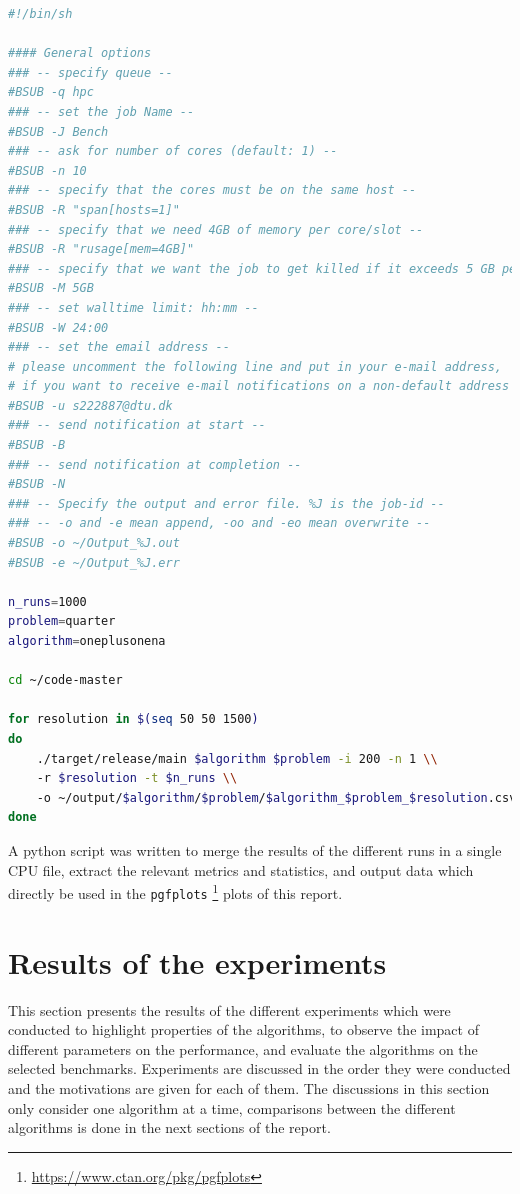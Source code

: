 \begin{lstlisting}[language=bash, caption=Example of a job script, label=lst:job_script]
#!/bin/sh

#### General options
### -- specify queue --
#BSUB -q hpc
### -- set the job Name --
#BSUB -J Bench
### -- ask for number of cores (default: 1) --
#BSUB -n 10
### -- specify that the cores must be on the same host --
#BSUB -R "span[hosts=1]"
### -- specify that we need 4GB of memory per core/slot --
#BSUB -R "rusage[mem=4GB]"
### -- specify that we want the job to get killed if it exceeds 5 GB per core/slot --
#BSUB -M 5GB
### -- set walltime limit: hh:mm --
#BSUB -W 24:00
### -- set the email address --
# please uncomment the following line and put in your e-mail address,
# if you want to receive e-mail notifications on a non-default address
#BSUB -u s222887@dtu.dk
### -- send notification at start --
#BSUB -B
### -- send notification at completion --
#BSUB -N
### -- Specify the output and error file. %J is the job-id --
### -- -o and -e mean append, -oo and -eo mean overwrite --
#BSUB -o ~/Output_%J.out
#BSUB -e ~/Output_%J.err

n_runs=1000
problem=quarter
algorithm=oneplusonena

cd ~/code-master

for resolution in $(seq 50 50 1500)
do
    ./target/release/main $algorithm $problem -i 200 -n 1 \\
    -r $resolution -t $n_runs \\
    -o ~/output/$algorithm/$problem/$algorithm_$problem_$resolution.csv
done
\end{lstlisting}

A python script was written to merge the results of the different runs in a single CPU file, extract the relevant metrics and statistics, and output data which directly be used
in the \texttt{pgfplots} \footnote{\url{https://www.ctan.org/pkg/pgfplots}}  plots of this report.

\section{Results of the experiments}
\label{sec:results}

This section presents the results of the different experiments which were conducted to highlight properties of the algorithms, to observe the impact of different parameters on the performance,
and evaluate the algorithms on the selected benchmarks. Experiments are discussed in the order they were conducted and the motivations are given for each of them.
The discussions in this section only consider one algorithm at a time, comparisons between the different algorithms is done in the next sections of the report.

